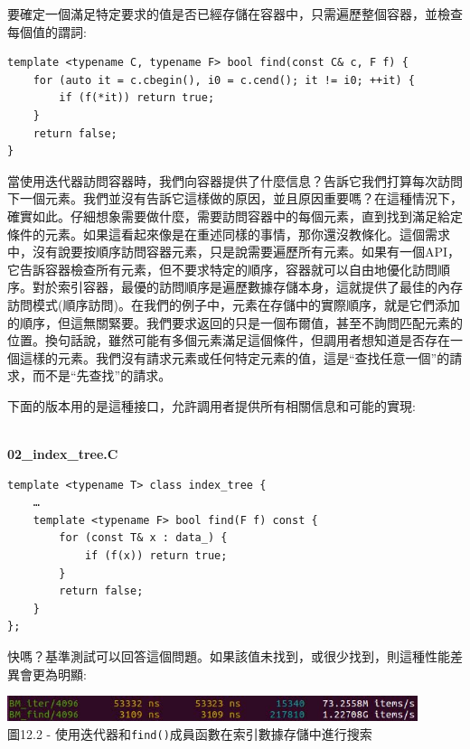 要確定一個滿足特定要求的值是否已經存儲在容器中，只需遍歷整個容器，並檢查每個值的謂詞:

\begin{lstlisting}[style=styleCXX]
template <typename C, typename F> bool find(const C& c, F f) {
	for (auto it = c.cbegin(), i0 = c.cend(); it != i0; ++it) {
		if (f(*it)) return true;
	}
	return false;
}
\end{lstlisting}

當使用迭代器訪問容器時，我們向容器提供了什麼信息？告訴它我們打算每次訪問下一個元素。我們並沒有告訴它這樣做的原因，並且原因重要嗎？在這種情況下，確實如此。仔細想象需要做什麼，需要訪問容器中的每個元素，直到找到滿足給定條件的元素。如果這看起來像是在重述同樣的事情，那你還沒教條化。這個需求中，沒有說要按順序訪問容器元素，只是說需要遍歷所有元素。如果有一個API，它告訴容器檢查所有元素，但不要求特定的順序，容器就可以自由地優化訪問順序。對於索引容器，最優的訪問順序是遍歷數據存儲本身，這就提供了最佳的內存訪問模式(順序訪問)。在我們的例子中，元素在存儲中的實際順序，就是它們添加的順序，但這無關緊要。我們要求返回的只是一個布爾值，甚至不詢問匹配元素的位置。換句話說，雖然可能有多個元素滿足這個條件，但調用者想知道是否存在一個這樣的元素。我們沒有請求元素或任何特定元素的值，這是“查找任意一個”的請求，而不是“先查找”的請求。 

下面的版本用的是這種接口，允許調用者提供所有相關信息和可能的實現:

\hspace*{\fill} \\ %
\noindent
\textbf{02\_index\_tree.C}
\begin{lstlisting}[style=styleCXX]
template <typename T> class index_tree {
	…
	template <typename F> bool find(F f) const {
		for (const T& x : data_) {
			if (f(x)) return true;
		}
		return false;
	}
};
\end{lstlisting}

快嗎？基準測試可以回答這個問題。如果該值未找到，或很少找到，則這種性能差異會更為明顯:

\begin{center}
\includegraphics[width=0.9\textwidth]{content/3/chapter12/images/2.jpg}\\
圖12.2 - 使用迭代器和\texttt{find()}成員函數在索引數據存儲中進行搜索
\end{center}

